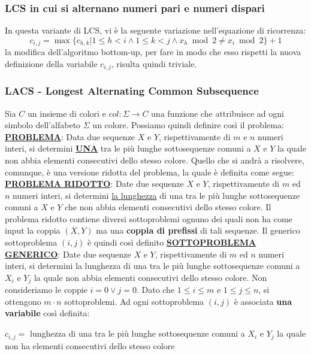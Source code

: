 \documentclass[12pt]{article}
\begin{document}
\subsubsection{LCS in cui si alternano numeri pari e numeri dispari}
In questa variante di LCS, vi è la seguente variazione nell'equazione di ricorrenza:
$$c_{i,j} = \max\{c_{h,k}|1 \leq h < i \land 1 \leq k < j \land x_h \bmod 2 \neq x_i \bmod 2\} + 1$$
la modifica dell'algoritmo bottom-up, per fare in modo che esso rispetti la nuova definizione della variabile $c_{i,j}$, risulta quindi triviale.
\subsubsection{LACS - Longest Alternating Common Subsequence}
Sia $C$ un insieme di colori e $col: \Sigma \rightarrow C$ una funzione che attribuisce ad ogni simbolo dell'alfabeto $\Sigma$ un colore.
Possiamo quindi definire così il problema: \newline
\textbf{\underline{PROBLEMA}}: Data due sequenze $X$ e $Y$, rispettivamente di $m$  e $n$ numeri interi, si determini \textbf{\underline{UNA}} tra le più lunghe sottosequenze comuni a $X$ e $Y$ la quale non abbia elementi consecutivi dello stesso colore. \newline
Quello che si andrà a risolvere, comunque, è una versione ridotta del problema, la quale è definita come segue: \newline
\textbf{\underline{PROBLEMA RIDOTTO}}: Date due sequenze $X$ e $Y$, rispettivamente di $m$ ed $n$ numeri interi, si determini \underline{la lunghezza} di una tra le più lunghe sottosequenze comuni a $X$ e $Y$ che non abbia elementi consecutivi dello stesso colore. \newline
Il problema ridotto contiene diversi sottoproblemi ognuno dei quali non ha come input la coppia $(X,Y)$ ma una \textbf{coppia di prefissi} di tali sequenze. Il generico sottoproblema $(i,j)$ è quindi così definito \newline
\textbf{\underline{SOTTOPROBLEMA GENERICO}}: Date due sequenze $X$ e $Y$, rispettivamente di $m$ ed $n$ numeri interi, si determini la lunghezza di una tra le più lunghe sottosequenze comuni a $X_i$ e $Y_j$ la quale non abbia elementi
consecutivi dello stesso colore. \newline
Non consideriamo le coppie $i = 0 \vee j = 0$. Dato che $1 \leq i \leq m$ e $1 \leq j \leq n$, si ottengono $m \cdot n$ sottoproblemi. 
Ad ogni sottoproblema $(i,j)$ è associata \textbf{una variabile} così definita:
\begin{center}
    $c_{i,j} =$ lunghezza di una tra le più lunghe sottosequenze comuni a $X_i$ e $Y_j$ la quale non ha elementi consecutivi dello stesso colore
\end{center}
\end{document}
